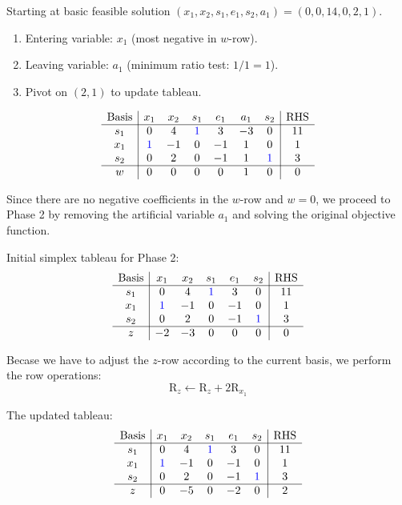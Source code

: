 \documentclass[a4paper, 10pt]{article}
\begin{document}
\begin{solution}
Starting at basic feasible solution \( (x_1, x_2, s_1, e_1, s_2, a_1) = (0, 0, 14, 0, 2, 1) \).
\begin{enumerate}
    \item Entering variable: \( x_1 \) (most negative in \( w \)-row).
    \item Leaving variable: \( a_1 \) (minimum ratio test: \( 1/1 = 1 \)).
    \item Pivot on \( (2,1) \) to update tableau.
\end{enumerate}
\[
\begin{array}{c|cccccc|c}
    \text{Basis} & x_1 & x_2 & s_1 & e_1 & a_1 & s_2 & \text{RHS} \\
    \hline
    s_1 & 0 & 4 & \textcolor[HTML]{0000FF}{1} & 3 & -3 & 0 & 11 \\
    x_1 & \textcolor[HTML]{0000FF}{1} & -1 & 0 & -1 & 1 & 0 & 1 \\
    s_2 & 0 & 2 & 0 & -1 & 1 & \textcolor[HTML]{0000FF}{1} & 3 \\
    \hline
    w & 0 & 0 & 0 & 0 & 1 & 0 & 0 \\
\end{array}
\]

Since there are no negative coefficients in the \( w \)-row and \( w = 0 \), we proceed to Phase 2 by removing the artificial variable \( a_1 \) and solving the original objective function.

Initial simplex tableau for Phase 2:
\[
\begin{array}{c|ccccc|c}
    \text{Basis} & x_1 & x_2 & s_1 & e_1 & s_2 & \text{RHS} \\
    \hline
    s_1 & 0 & 4 & \textcolor[HTML]{0000FF}{1} & 3 & 0 & 11 \\
    x_1 & \textcolor[HTML]{0000FF}{1} & -1 & 0 & -1 & 0 & 1 \\
    s_2 & 0 & 2 & 0 & -1 & \textcolor[HTML]{0000FF}{1} & 3 \\
    \hline
    z & -2 & -3 & 0 & 0 & 0 & 0 \\
\end{array}
\]

Becase we have to adjust the \( z \)-row according to the current basis, we perform the row operations:
\[\text{R}_z \leftarrow \text{R}_z + 2\text{R}_{x_1} \]

The updated tableau:
\[
\begin{array}{c|ccccc|c}
    \text{Basis} & x_1 & x_2 & s_1 & e_1 & s_2 & \text{RHS} \\
    \hline
    s_1 & 0 & 4 & \textcolor[HTML]{0000FF}{1} & 3 & 0 & 11 \\
    x_1 & \textcolor[HTML]{0000FF}{1} & -1 & 0 & -1 & 0 & 1 \\
    s_2 & 0 & 2 & 0 & -1 & \textcolor[HTML]{0000FF}{1} & 3 \\
    \hline
    z & 0 & -5 & 0 & -2 & 0 & 2 \\
\end{array}
\]


\end{solution}
\end{document}
